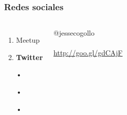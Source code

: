 \documentclass{beamer}
\begin{document}
\begin{frame}
\frametitle{Redes sociales}
\begin{columns}[c] %

\begin{enumerate}
\item Meetup
\item \textbf{Twitter}
\item[•]	
\item[•]	
\item[•]	
\end{enumerate}

{\color{blue}@jessecogollo}
\\~\\
{\color{blue}\url{http://goo.gl/gdCAjF}}
\end{columns}
\end{frame}
\end{document}
